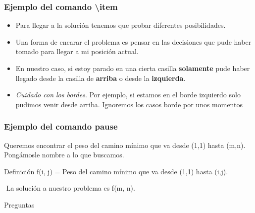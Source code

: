 \documentclass{beamer}
\begin{document}

\begin{frame}
\frametitle{Ejemplo del comando \textbackslash item}

\begin{itemize}
    \item<1-> {Para llegar a la solución tenemos que probar diferentes posibilidades.}
    \item<2-> {Una forma de encarar el problema es pensar en las decisiones que pude haber tomado para llegar a mi posición actual.}
    \item<3-> {En nuestro caso, si estoy parado en una cierta casilla \textbf{solamente} pude haber llegado desde la casilla de \textbf{arriba} o desde la \textbf{izquierda}.}
    \item<4> {\textit{Cuidado con los bordes}. Por ejemplo, si estamos en el borde izquierdo solo pudimos venir desde arriba. Ignoremos los casos borde por unos momentos}

\end{itemize}

\end{frame}


\begin{frame}
\frametitle{Ejemplo del comando pause}

Queremos encontrar el peso del camino mínimo que va desde (1,1) hasta (m,n). Pongámosle nombre a lo que buscamos.\\
\pause
\begin{block}{Definición}
f(i, j) = Peso del camino mínimo que va desde (1,1) hasta (i,j).
\end{block}
\pause
$ $\newline
La solución a nuestro problema es f(m, n).
\end{frame}






\begin{frame}
\Huge{\centerline{Preguntas}}
\end{frame}

\end{document}
